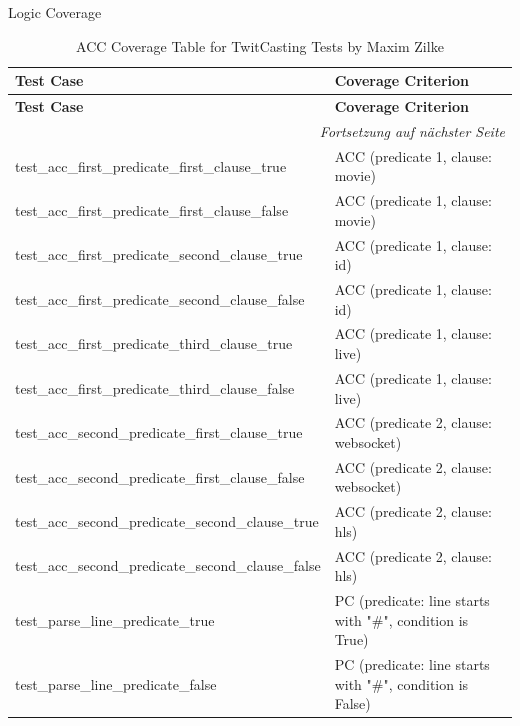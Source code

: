 \documentclass[a4paper]{scrreprt}
\newcounter{question}
\begin{document}
\begin{question}{Logic Coverage}
\begin{enumerate}[topsep=0pt, leftmargin=*]
\begin{answer}
     \begin{longtable}{|l|l|}
\caption{ACC Coverage Table for TwitCasting Tests by Maxim Zilke} \label{tab:acc-coverage} \\
\hline
\textbf{Test Case} & \textbf{Coverage Criterion} \\
\hline
\endfirsthead

\hline
\textbf{Test Case} & \textbf{Coverage Criterion} \\
\hline
\endhead

\hline
\multicolumn{2}{r}{\textit{Fortsetzung auf nächster Seite}} \\
\hline
\endfoot

\hline
\endlastfoot
test\_acc\_first\_predicate\_first\_clause\_true & ACC (predicate 1, clause: movie) \\
test\_acc\_first\_predicate\_first\_clause\_false & ACC (predicate 1, clause: movie) \\
test\_acc\_first\_predicate\_second\_clause\_true & ACC (predicate 1, clause: id) \\
test\_acc\_first\_predicate\_second\_clause\_false & ACC (predicate 1, clause: id) \\
test\_acc\_first\_predicate\_third\_clause\_true & ACC (predicate 1, clause: live) \\
test\_acc\_first\_predicate\_third\_clause\_false & ACC (predicate 1, clause: live) \\
test\_acc\_second\_predicate\_first\_clause\_true & ACC (predicate 2, clause: websocket) \\
test\_acc\_second\_predicate\_first\_clause\_false & ACC (predicate 2, clause: websocket) \\
test\_acc\_second\_predicate\_second\_clause\_true & ACC (predicate 2, clause: hls) \\
test\_acc\_second\_predicate\_second\_clause\_false & ACC (predicate 2, clause: hls) \\
test\_parse\_line\_predicate\_true & PC (predicate: line starts with "\#", condition is True) \\
test\_parse\_line\_predicate\_false & PC (predicate: line starts with "\#", condition is False) \\



\end{longtable}
\end{answer}
\end{enumerate}
\end{question}
\end{document}
